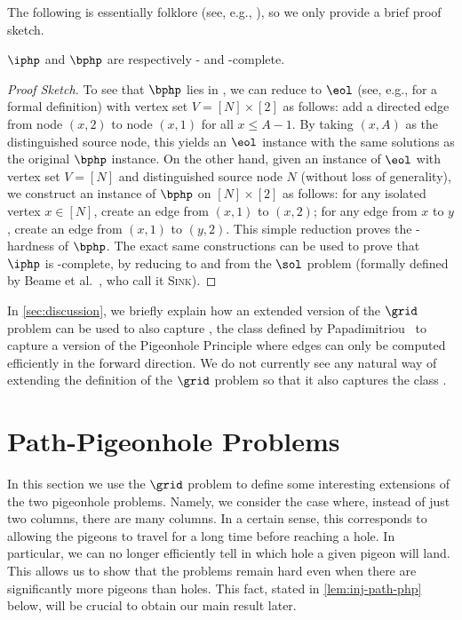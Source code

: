 The following is essentially folklore (see, e.g., \cite{Buresh2004}), so we only provide a brief proof sketch.

\begin{lemma}\label{lem:PPAD-as-PHP}
$\iphp$ and $\bphp$ are respectively \PPADS- and \PPAD-complete.
\end{lemma}

\begin{proof}[Proof Sketch]
To see that $\bphp$ lies in \PPAD, we can reduce to $\eol$ (see, e.g., \cite{Daskalakis2009} for a formal definition) with vertex set $V = [N] \times [2]$ as follows: add a directed edge from node $(x,2)$ to node $(x,1)$ for all $x \leq A-1$. By taking $(x,A)$ as the distinguished source node, this yields an $\eol$ instance with the same solutions as the original $\bphp$ instance. On the other hand, given an instance of $\eol$ with vertex set $V = [N]$ and distinguished source node $N$ (without loss of generality), we construct an instance of $\bphp$ on $[N] \times [2]$ as follows: for any isolated vertex $x \in [N]$, create an edge from $(x,1)$ to $(x,2)$; for any edge from $x$ to $y$, create an edge from $(x,1)$ to $(y,2)$. This simple reduction proves the \PPAD-hardness of $\bphp$. The exact same constructions can be used to prove that $\iphp$ is \PPADS-complete, by reducing to and from the $\sol$ problem (formally defined by Beame et al.~\cite{Beame1998}, who call it {\scshape Sink}).
\end{proof}








In \cref{sec:discussion}, we briefly explain how an extended version of the $\grid$ problem can be used to also capture \PPP, the class defined by Papadimitriou~\cite{Papadimitriou1994} to capture a version of the Pigeonhole Principle where edges can only be computed efficiently in the forward direction. We do not currently see any natural way of extending the definition of the $\grid$ problem so that it also captures the class \PPA.










\section{Path-Pigeonhole Problems}

In this section we use the $\grid$ problem to define some interesting extensions of the two pigeonhole problems. Namely, we consider the case where, instead of just two columns, there are many columns. In a certain sense, this corresponds to allowing the pigeons to travel for a long time before reaching a hole. In particular, we can no longer efficiently tell in which hole a given pigeon will land. This allows us to show that the problems remain hard even when there are significantly more pigeons than holes. This fact, stated in \cref{lem:inj-path-php} below, will be crucial to obtain our main result later.

